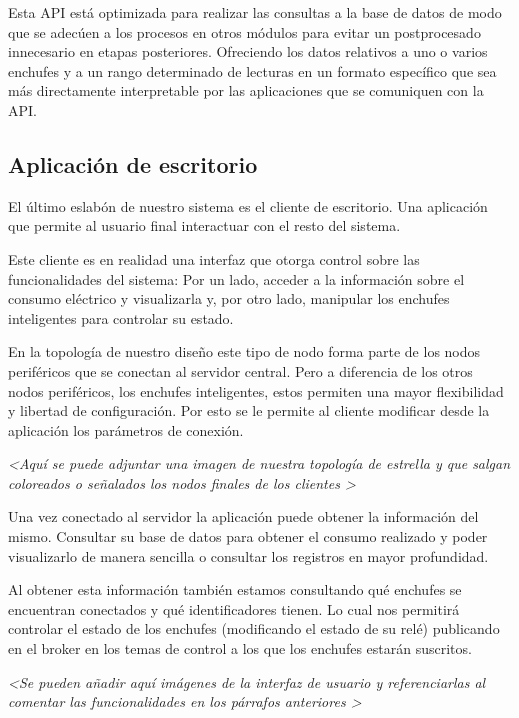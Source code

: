 \documentclass[a4paper,10pt]{article}
\begin{document}
Esta API está optimizada para realizar las consultas a la base de
datos de modo que se adecúen a los procesos en otros módulos para
evitar un postprocesado innecesario en etapas posteriores. Ofreciendo
los datos relativos a uno o varios enchufes y a un rango determinado
de lecturas en un formato específico que sea más directamente
interpretable por las aplicaciones que se comuniquen con la API.

\newpage

\subsection{Aplicación de escritorio}

El último eslabón de nuestro sistema es el cliente de escritorio. Una
aplicación que permite al usuario final interactuar con el resto del
sistema.

Este cliente es en realidad una interfaz que otorga control sobre las
funcionalidades del sistema: Por un lado, acceder a la información
sobre el consumo eléctrico y visualizarla y, por otro lado, manipular
los enchufes inteligentes para controlar su estado.

En la topología de nuestro diseño este tipo de nodo forma parte de los
nodos periféricos que se conectan al servidor central. Pero a
diferencia de los otros nodos periféricos, los enchufes inteligentes,
estos permiten una mayor flexibilidad y libertad de configuración. Por
esto se le permite al cliente modificar desde la aplicación los
parámetros de conexión.

\textit{\textless Aquí se puede adjuntar una imagen de nuestra
  topología de estrella y que salgan coloreados o señalados los nodos
  finales de los clientes \textgreater}

Una vez conectado al servidor la aplicación puede obtener la
información del mismo. Consultar su base de datos para obtener el
consumo realizado y poder visualizarlo de manera sencilla o consultar
los registros en mayor profundidad.

Al obtener esta información también estamos consultando qué enchufes
se encuentran conectados y qué identificadores tienen. Lo cual nos
permitirá controlar el estado de los enchufes (modificando el estado
de su relé) publicando en el broker en los temas de control a los que
los enchufes estarán suscritos.

\textit{\textless Se pueden añadir aquí imágenes de la interfaz de
  usuario y referenciarlas al comentar las funcionalidades en los
  párrafos anteriores \textgreater}
\end{document}
